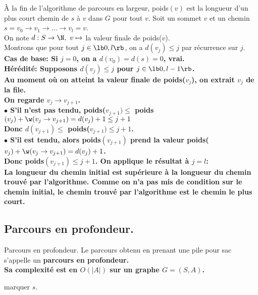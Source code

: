 \documentclass[french, 11pt]{article}
\begin{document}
\begin{thm}{}{}
    À la fin de l'algorithme de parcours en largeur, poids$(v)$ est la longueur d'un plus court chemin de $s$ à $v$ dans $G$ pour tout $v$.
    \tcblower
    Soit un sommet $v$ et un chemin $s=v_0\to v_1 \to ... \to v_l = v$.\\
    On note $d: S \to \N, ~ v\mapsto$ la valeur finale de poids($v$).\\
    Montrons que pour tout $j\in\lb0,l\rb$, on a $d(v_j)\leq j$ par récurrence sur $j$.\\
    \bf{Cas de base:} Si $j=0$, on a $d(v_0)=d(s)=0$, vrai.\\
    \bf{Hérédité:} Supposons $d(v_j)\leq j$ pour $j\in\lb0,l-1\rb$.\\
    Au moment où on atteint la valeur finale de poids($v_j$), on extrait $v_j$ de la file.\\
    On regarde $v_j\to v_{j+1}$.\\
    $\bullet$ S'il n'est pas tendu, poids($v_{j+1}) \leq $ poids$(v_j)+\w(v_j\to v_{j+1})=d(v_j)+1\leq j+1$\\
    Donc $d(v_{j+1})\leq$ poids($v_{j+1}) \leq j+1$.\\
    $\bullet$ S'il est tendu, alors poids$(v_{j+1})$ prend la valeur poids($v_j)+\w(v_j\to v_{j+1})=d(v_j)+1$.\\
    Donc poids$(v_{j+1})\leq j+1$.\n
    On applique le résultat à $j=l$:\\
    La longueur du chemin initial est supérieure à la longueur du chemin trouvé par l'algorithme. Comme on n'a pas mis de condition sur le chemin initial, le chemin trouvé par l'algorithme est le chemin le plus court.
\end{thm}

\subsection{Parcours en profondeur.}

\begin{defi}{Parcours en profondeur.}{}
    Le parcours obtenu en prenant une pile pour sac s'appelle un \bf{parcours en profondeur.}\\
    Sa complexité est en $O(|A|)$ sur un graphe $G=(S,A)$.\n
    \begin{algorithm}[H]
        \LinesNumbered
        \caption{Parcours en profondeur récursif.}
        marquer $s$.\\
    \end{algorithm}
\end{defi}
\end{document}
